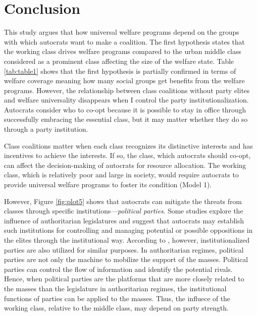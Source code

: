 \documentclass[11pt, notitlepage]{article}
\begin{document}
\section{Conclusion}

This study argues that how universal welfare programs depend on the groups with which autocrats want to make a coalition. The first hypothesis states that the working class drives welfare programs compared to the urban middle class considered as a prominent class affecting the size of the welfare state. Table \ref{tab:table1} shows that the first hypothesis is partially confirmed in terms of welfare coverage meaning how many social groups get benefits from the welfare programs. However, the relationship between class coalitions without party elites and welfare universality disappears when I control the party institutionalization. Autocrats consider who to co-opt because it is possible to stay in office through successfully embracing the essential class, but it may matter whether they do so through a party institution.

Class coalitions matter when each class recognizes its distinctive interests and has incentives to achieve the interests. If so, the class, which autocrats should co-opt, can affect the decision-making of autocrats for resource allocation. The working class, which is relatively poor and large in society, would require autocrats to provide universal welfare programs to foster its condition (Model 1). 

However, Figure \ref{fig:plot5} shows that autocrats can mitigate the threats from classes through specific institutions---\textit{political parties}. Some studies explore the influence of authoritarian legislatures \citep{Jensen2014, Truex2012} and suggest that autocrats may establish such institutions for controlling and managing potential or possible oppositions in the elites through the institutional way. According to \citet{Magaloni2006}, however, institutionalized parties are also utilized for similar purposes. In authoritarian regimes, political parties are not only the machine to mobilize the support of the masses. Political parties can control the flow of information and identify the potential rivals. Hence, when political parties are the platforms that are more closely related to the masses than the legislature in authoritarian regimes, the institutional functions of parties can be applied to the masses. Thus, the influece of the working class, relative to the middle class, may depend on party strength.
\end{document}
